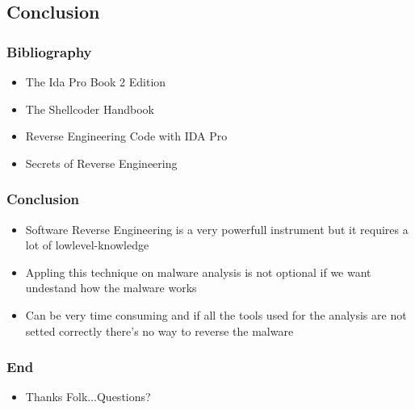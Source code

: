 \documentclass[]{beamer}
\begin{document}
	\subsection{Conclusion}
		\begin{frame}
			\frametitle{Bibliography}
			\begin{itemize}
				\item{The Ida Pro Book 2 Edition }
				\item{The Shellcoder Handbook}
				\item{Reverse Engineering Code with IDA Pro}
				\item{Secrets of Reverse Engineering}
			\end{itemize}
		\end{frame}
	 	\begin{frame}
			\frametitle{Conclusion}
			\begin{itemize}
				\item{Software Reverse Engineering is a very powerfull instrument but it requires a lot of lowlevel-knowledge }
				\item{Appling this technique on malware analysis is not optional if we want undestand how the malware works}
				\item{Can be very time consuming and if all the tools used for the analysis are not setted correctly there's no way to reverse the malware }
			\end{itemize}
		\end{frame}
		\begin{frame}
			\frametitle{End}
			\begin{itemize}
				\item{Thanks Folk...Questions?}
			\end{itemize}
		\end{frame}

\end{document}
